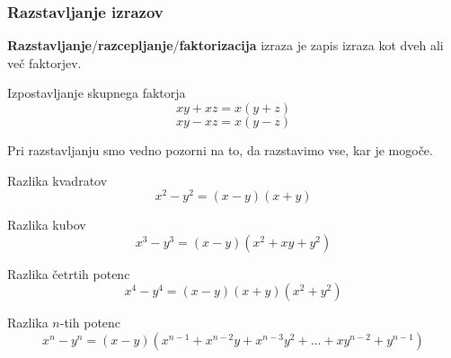     \begin{frame}
        \frametitle{Razstavljanje izrazov}

        \begin{alertblock}{}
            \textbf{Razstavljanje}/\textbf{razcepljanje}/\textbf{faktorizacija} izraza je zapis izraza kot dveh ali več faktorjev.
        \end{alertblock}
        
        \begin{block}{Izpostavljanje skupnega faktorja}
            $$xy+ xz=x(y+ z)$$            
            $$xy- xz=x(y- z)$$            
        \end{block}

        \begin{block}{}
            Pri razstavljanju smo vedno pozorni na to, da razstavimo vse, kar je mogoče.
        \end{block}

    \end{frame}

    \begin{frame}
        
        \begin{block}{Razlika kvadratov}
            $$x^2-y^2=(x-y)(x+y)$$
        \end{block}

        \begin{block}{Razlika kubov}
            $$ x^3-y^3=(x-y)(x^2+xy+y^2) $$
        \end{block}

        \begin{block}{Razlika četrtih potenc}
            $$x^4-y^4=(x-y)(x+y)(x^2+y^2)$$
        \end{block}

        \begin{block}{Razlika $n$-tih potenc}
            $$x^n-y^n=(x-y)(x^{n-1}+x^{n-2}y+x^{n-3}y^2+\ldots+xy^{n-2}+y^{n-1})$$
        \end{block}

    \end{frame}

